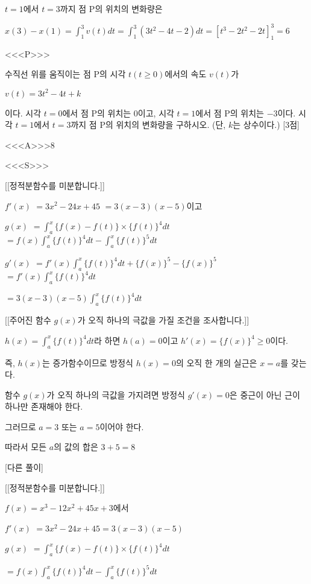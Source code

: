 \documentclass{oblivoir}
\begin{document}
$t=1$에서 $t=3$까지 점 $\mathrm{P}$의 위치의 변화량은

$x(3)-x(1)=\displaystyle\int_{1}^{3}v(t)dt=\displaystyle\int_{1}^{3}(3t^{2}-4t-2)dt=\left[t^{3}-2t^{2}-2t\right]_{1}^{3}=6$

<<<P>>>

수직선 위를 움직이는 점 $\mathrm{P}$의 시각 $t(t\ge 0)$에서의 속도 $v(t)$가

$v(t)=3t^{2}-4t+k$

이다. 시각 $t=0$에서 점 $\mathrm{P}$의 위치는 $0$이고, 시각 $t=1$에서 점 $\mathrm{P}$의 위치는 $-3$이다. 시각 $t=1$에서 $t=3$까지 점 $\mathrm{P}$의 위치의 변화량을 구하시오. (단, $k$는 상수이다.) [3점]

<<<A>>>$8$

<<<S>>>

[[정적분함수를 미분합니다.]]

$f'(x)$ $=3x^{2}-24x+45$ $=3(x-3)(x-5)$이고

$g(x)$ $=\displaystyle\int_{a}^{x}\{f(x)-f(t)\}\times\{f(t)\}^{4}dt$
$=f(x)\displaystyle\int_{a}^{x}\{f(t)\}^{4}dt -\displaystyle\int_{a}^{x}\{f(t)\}^{5}dt$

$g'(x)$ $=f'(x)\displaystyle\int_{a}^{x}\{f(t)\}^{4}dt +\{f(x)\}^{5}-\{f(x)\}^{5}$
$=f'(x)\displaystyle\int_{a}^{x}\{f(t)\}^{4}dt$

$=3(x-3)(x-5)\displaystyle\int_{a}^{x}\{f(t)\}^{4}dt$

[[주어진 함수 $g(x)$가 오직 하나의 극값을 가질 조건을 조사합니다.]]

$h(x)=\displaystyle\int_{a}^{x}\{f(t)\}^{4}dt$라 하면 $h(a)=0$이고 $h'(x)=\{f(x)\}^{4}\ge 0$이다.

즉, $h(x)$는 증가함수이므로 방정식 $h(x)=0$의 오직 한 개의 실근은 $x=a$를 갖는다.

함수 $g(x)$가 오직 하나의 극값을 가지려면 방정식 $g'(x)=0$은 중근이 아닌 근이 하나만 존재해야 한다.

그러므로 $a=3$ 또는 $a=5$이어야 한다.

따라서 모든 $a$의 값의 합은 $3+5 =8$

[다른 풀이]

[[정적분함수를 미분합니다.]]

$f(x)=x^{3}-12x^{2}+45x+3$에서

$f'(x)$ $=3x^{2}-24x+45$$=3(x-3)(x-5)$

$g(x)$ $=\displaystyle\int_{a}^{x}\{f(x)-f(t)\}\times\{f(t)\}^{4}dt$

$=f(x)\displaystyle\int_{a}^{x}\{f(t)\}^{4}dt -\displaystyle\int_{a}^{x}\{f(t)\}^{5}dt$
\end{document}
